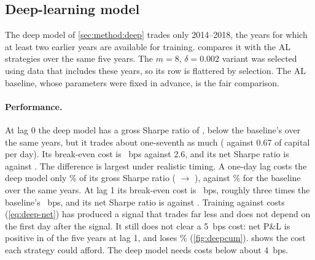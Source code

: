 \subsection{Deep-learning model}
\label{sec:results:deep}

The deep model of \cref{sec:method:deep} trades only 2014--2018, the years for which at least two
earlier years are available for training.  compares it with the AL strategies over
the same five years. The $m=8$, $\delta=0.002$ variant was selected using data that includes these
years, so its row is flattered by selection. The AL baseline, whose parameters were fixed in
advance, is the fair comparison.

\begin{table}[ht]
\centering
\caption{The deep model against the AL strategies over its trading years, 2014--2018 (5~bps stock
cost). The strategies run at different gross exposures, so Sharpe ratios and break-even costs are
comparable across rows but returns and volatilities are not.
\textsuperscript{*}Selected using data that includes these years.}
\label{tab:deep}
\small

\end{table}

\paragraph{Performance.} At lag 0 the deep model has a gross Sharpe ratio of \DeepGrossSR{}, below
the baseline's \ALDeepYearsGrossSR{} over the same years, but it trades about one-seventh as much
(\DeepTO{} against 0.67 of capital per day). Its break-even cost is \DeepBE~bps against 2.6, and its
net Sharpe ratio is \DeepNetSR{} against \ALDeepYearsNetSR. The difference is largest under
realistic timing. A one-day lag costs the deep model only \DeepLagLoss\% of its gross Sharpe ratio
(\DeepGrossSR{} $\to$ \DeepLagGrossSR), against \ALDeepYearsLagLoss\% for the baseline over the same
years. At lag 1 its break-even cost is \DeepLagBE~bps, roughly three times the baseline's
\ALDeepYearsLagBE~bps, and its net Sharpe ratio is \DeepLagNetSR{} against \ALDeepYearsLagNetSR.
Training against costs (\cref{eq:deep-net}) has produced a signal that trades far less and does
not depend on the first day after the signal. It still does not clear a 5~bps cost: net P\&L is
positive in \DeepLagPosYears{} of the five years at lag 1, and \DeepLagWorstYear{} loses
\DeepLagWorstYearRet\% (\cref{fig:deepcum}).  shows the cost each strategy could
afford. The deep model needs costs below about 4~bps.


